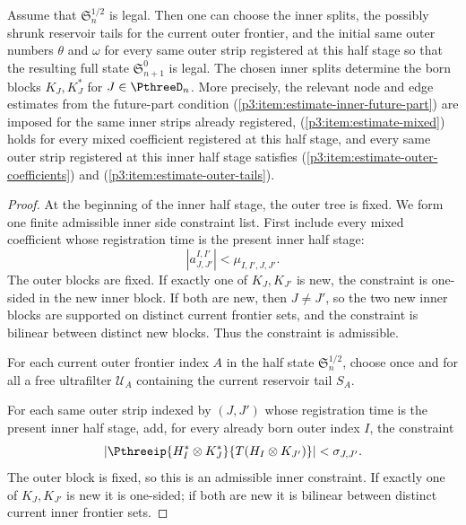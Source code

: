 \documentclass[11pt,reqno]{amsart}
\makeatletter
\theoremstyle{plain}
\theoremstyle{definition}
\newcounter{problempaper}
\newenvironment{problempaperbody}{%
  \setcounter{subsection}{0}%
  \setcounter{subsubsection}{0}%
  \setcounter{paragraph}{0}%
  \renewcommand{\thesubsection}{\arabic{subsection}}%
  \renewcommand{\thesubsubsection}{\thesubsection.\arabic{subsubsection}}%
  \renewcommand{\theparagraph}{\thesubsubsection.\arabic{paragraph}}%
  \let\problem@outersection\section
  \let\problem@outersubsection\subsection
  \let\problem@outersubsubsection\subsubsection
  \let\problem@outerparagraph\paragraph
  \let\section\problem@papersection
  \let\subsection\problem@papersubsection
  \let\subsubsection\problem@papersubsubsection
}{%
  \let\section\problem@outersection
  \let\subsection\problem@outersubsection
  \let\subsubsection\problem@outersubsubsection
  \let\paragraph\problem@outerparagraph
}
\newcommand{\problem@target}[2]{%
  \hypertarget{problem-\theproblempaper-#1-#2}{}%
}
\newcommand{\problem@paperheading}[3]{%
  \par\bigskip
  \problem@target{#1}{#2}%
  \noindent{\large\bfseries #2.\quad #3\par}%
  \nobreak\smallskip
}
\newcommand{\problem@papersubheading}[3]{%
  \par\medskip
  \problem@target{#1}{#2}%
  \noindent{\normalsize\bfseries #2.\quad #3\par}%
  \nobreak\smallskip
}
\newcommand{\problem@papersubsubheading}[3]{%
  \par\smallskip
  \problem@target{#1}{#2}%
  \noindent{\normalsize\itshape #2.\quad #3.\ }%
}
\def\problem@papersection{%
  \@ifstar{\problem@papersectionstar}{\problem@papersectionnostar}%
}
\def\problem@papersectionstar#1{%
  \par\bigskip\noindent{\large\bfseries #1\par}\nobreak\smallskip
}
\def\problem@papersectionnostar#1{%
  \refstepcounter{subsection}%
  \setcounter{subsubsection}{0}%
  \setcounter{paragraph}{0}%
  \problem@paperheading{section}{\thesubsection}{#1}%
  \problem@writecontentsline{section}{\thesubsection}{#1}%
}
\def\problem@papersubsection{%
  \@ifstar{\problem@papersubsectionstar}{\problem@papersubsectionnostar}%
}
\def\problem@papersubsectionstar#1{%
  \par\medskip\noindent{\normalsize\bfseries #1\par}\nobreak\smallskip
}
\def\problem@papersubsectionnostar#1{%
  \refstepcounter{subsubsection}%
  \setcounter{paragraph}{0}%
  \problem@papersubheading{subsection}{\thesubsubsection}{#1}%
  \problem@writecontentsline{subsection}{\thesubsubsection}{#1}%
}
\def\problem@papersubsubsection{%
  \@ifstar{\problem@papersubsubsectionstar}{\problem@papersubsubsectionnostar}%
}
\def\problem@papersubsubsectionstar#1{%
  \par\smallskip\noindent{\normalsize\itshape #1.\ }%
}
\def\problem@papersubsubsectionnostar#1{%
  \refstepcounter{paragraph}%
  \problem@papersubsubheading{subsubsection}{\theparagraph}{#1}%
  \problem@writecontentsline{subsubsection}{\theparagraph}{#1}%
}
\newcommand{\problem@writecontentsline}[3]{%
  \begingroup
  \protected@write\@auxout{}{%
    \string\problemcontentsentry{\theproblempaper}{#1}{#2}{#3}{\thepage}%
  }%
  \endgroup
}
\newcommand{\problemcontentsentry}[5]{%
  \@ifundefined{problemcontents@#1}{%
    \expandafter\gdef\csname problemcontents@#1\endcsname{}%
  }{}%
  \expandafter\g@addto@macro\csname problemcontents@#1\endcsname{%
    \problemcontentsline{#1}{#2}{#3}{#4}{#5}%
  }%
}
\newcommand{\problemcontentslink}[4]{%
  \hyperlink{problem-#1-#2-#3}{#4}%
}
\newcommand{\problemcontentsline}[5]{%
  \ifstrequal{#2}{section}{%
    \par\noindent
    \problemcontentslink{#1}{#2}{#3}{\makebox[2.5em][l]{#3}#4}%
    \nobreak\dotfill
    \problemcontentslink{#1}{#2}{#3}{#5}\par
  }{%
    \ifstrequal{#2}{subsection}{%
      \par\noindent\hspace*{1.5em}%
      \problemcontentslink{#1}{#2}{#3}{\makebox[3.5em][l]{#3}#4}%
      \nobreak\dotfill
      \problemcontentslink{#1}{#2}{#3}{#5}\par
    }{%
      \par\noindent\hspace*{3em}%
      \problemcontentslink{#1}{#2}{#3}{\makebox[4.5em][l]{#3}#4}%
      \nobreak\dotfill
      \problemcontentslink{#1}{#2}{#3}{#5}\par
    }%
  }%
}
\makeatother
\begin{document}
\begin{problempaperbody}
\begin{p3claim}
\label{p3:claim:inner-half-stage}
Assume that $\mathfrak S_n^{1/2}$ is legal. Then one can choose the inner splits, the possibly shrunk reservoir tails for the current outer frontier, and the initial same outer numbers $\theta$ and $\omega$ for every same outer strip registered at this half stage so that the resulting full state $\mathfrak S_{n+1}^0$ is legal. The chosen inner splits determine the born blocks $K_J,K_J^*$ for $J\in\PthreeD_n$. More precisely, the relevant node and edge estimates from the future-part condition \textup{(\ref{p3:item:estimate-inner-future-part})} are imposed for the same inner strips already registered, \textup{(\ref{p3:item:estimate-mixed})} holds for every mixed coefficient registered at this half stage, and every same outer strip registered at this inner half stage satisfies \textup{(\ref{p3:item:estimate-outer-coefficients})} and \textup{(\ref{p3:item:estimate-outer-tails})}.
\end{p3claim}

\begin{proof}
At the beginning of the inner half stage, the outer tree is fixed. We form one finite admissible inner side constraint list. First include every mixed coefficient whose registration time is the present inner half stage:
\begin{equation*}
        |a_{J,J'}^{I,I'}|<\mu_{I,I',J,J'}.
\end{equation*}
The outer blocks are fixed. If exactly one of $K_J,K_{J'}$ is new, the constraint is one-sided in the new inner block. If both are new, then $J\ne J'$, so the two new inner blocks are supported on distinct current frontier sets, and the constraint is bilinear between distinct new blocks. Thus the constraint is admissible.

For each current outer frontier index $A$ in the half state $\mathfrak S_n^{1/2}$, choose once and for all a free ultrafilter $\mathcal U_A$ containing the current reservoir tail $S_A$.

For each same outer strip indexed by $(J,J')$ whose registration time is the present inner half stage, add, for every already born outer index $I$, the constraint
\begin{equation*}
        |\Pthreeip{H_I^*\otimes K_J^*}{T(H_I\otimes K_{J'})}|<\sigma_{J,J'}.
\end{equation*}
The outer block is fixed, so this is an admissible inner constraint. If exactly one of $K_J,K_{J'}$ is new it is one-sided; if both are new it is bilinear between distinct current inner frontier sets.


\end{proof}
\end{problempaperbody}
\end{document}
